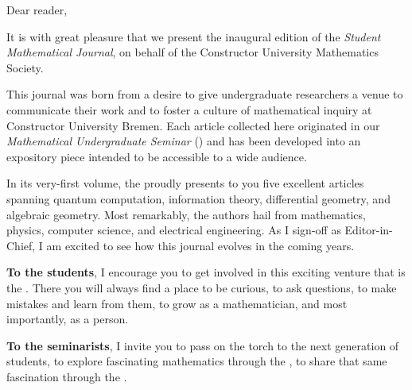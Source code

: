 
\noindent Dear reader,

\vspace{0.25cm}

It is with great pleasure that we present the inaugural edition of the
{\color{smjcrimson}\textit{Student Mathematical Journal}}, on behalf of the
Constructor University Mathematics Society.

\vspace{0.25cm}

This journal was born from a desire to give undergraduate researchers a venue
to communicate their work and to foster a culture of mathematical inquiry at
Constructor University Bremen. Each article collected here originated in our
{\color{smjgold}\emph{Mathematical Undergraduate Seminar}} (\UgS) and has been developed into an expository
piece intended to be accessible to a wide audience.

\vspace{0.25cm}

In its very-first volume, the \SMJ proudly presents to you
five excellent articles spanning quantum computation, information theory, 
differential geometry, and algebraic geometry. Most remarkably, the authors
hail from mathematics, physics, computer science, and electrical engineering. As I sign-off as Editor-in-Chief, I am excited to see how this journal evolves in
the coming years. 

\vspace{0.25cm}


\textbf{To the students}, I encourage you to get involved in this exciting venture
that is the \UgS. There you will always find a place to be curious, to ask questions, to make mistakes 
and learn from them, to grow as a mathematician, and most importantly, as a person. 

\vspace{0.25cm}

\textbf{To the seminarists}, I invite you to pass on the torch to the next generation
of students, to explore fascinating mathematics through the \UgS, to share that same fascination
through the \SMJ. 

\vspace{0.25cm}

